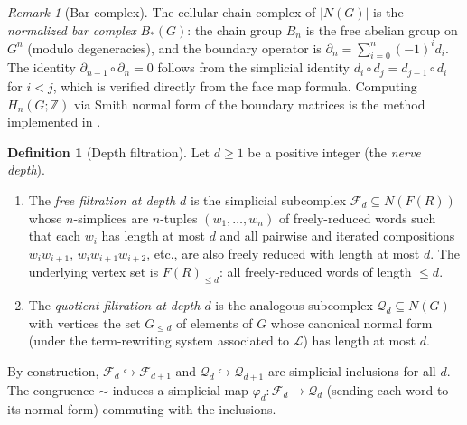 \documentclass{article}
\theoremstyle{definition}
\newtheorem{definition}[theorem]{Definition}
\theoremstyle{remark}
\newtheorem{remark}[theorem]{Remark}
\begin{document}
\begin{remark}[Bar complex]
The cellular chain complex of $|N(G)|$ is the \emph{normalized
bar complex} $\bar{B}_*(G)$: the chain group $\bar{B}_n$ is the
free abelian group on $G^n$ (modulo degeneracies), and the
boundary operator is $\partial_n = \sum_{i=0}^n (-1)^i d_i$.
The identity $\partial_{n-1} \circ \partial_n = 0$ follows from
the simplicial identity $d_i \circ d_j = d_{j-1} \circ d_i$
for $i < j$, which is verified directly from the face map formula.
Computing $H_n(G;\mathbb{Z})$ via Smith normal form of the boundary
matrices is the method implemented in .
\end{remark}

\begin{definition}[Depth filtration]
\label{def:filtration}
Let $d \geq 1$ be a positive integer (the \emph{nerve depth}).

\begin{enumerate}[label=(\roman*)]
  \item The \emph{free filtration at depth $d$} is the simplicial
        subcomplex $\mathcal{F}_d \subseteq N(F(R))$ whose $n$-simplices
        are $n$-tuples $(w_1, \dots, w_n)$ of freely-reduced words
        such that each $w_i$ has length at most $d$ and all
        pairwise and iterated compositions $w_i w_{i+1}$,
        $w_i w_{i+1} w_{i+2}$, etc., are also freely reduced with
        length at most $d$. The underlying vertex set is
        $F(R)_{\leq d}$: all freely-reduced words of length $\leq d$.

  \item The \emph{quotient filtration at depth $d$} is the
        analogous subcomplex $\mathcal{Q}_d \subseteq N(G)$ with
        vertices the set $G_{\leq d}$ of elements of $G$ whose
        canonical normal form (under the term-rewriting system
        associated to $\mathcal{L}$) has length at most $d$.
\end{enumerate}

By construction, $\mathcal{F}_d \hookrightarrow \mathcal{F}_{d+1}$
and $\mathcal{Q}_d \hookrightarrow \mathcal{Q}_{d+1}$ are
simplicial inclusions for all $d$. The congruence $\sim$ induces
a simplicial map $\varphi_d : \mathcal{F}_d \to \mathcal{Q}_d$
(sending each word to its normal form) commuting with the
inclusions.
\end{definition}
\end{document}
